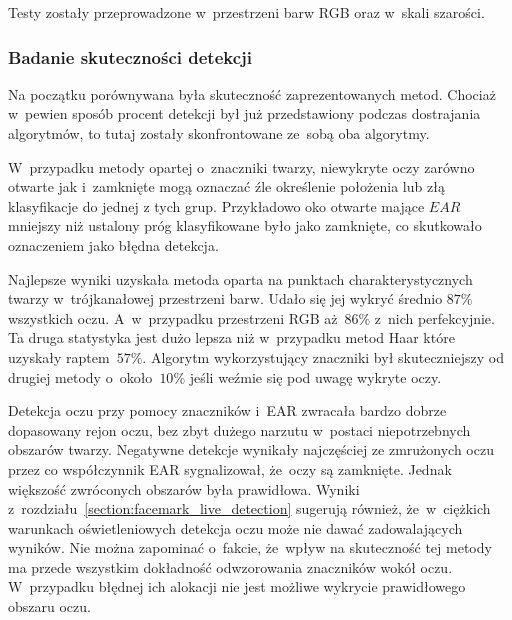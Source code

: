 \par

Testy zostały przeprowadzone w~przestrzeni barw RGB oraz w~skali szarości.

\subsubsection{Badanie skuteczności detekcji}

Na początku porównywana była skuteczność zaprezentowanych metod. Chociaż w~pewien sposób procent detekcji był już przedstawiony podczas dostrajania algorytmów, to tutaj zostały skonfrontowane ze~sobą oba algorytmy.

\par

W~przypadku metody opartej o~znaczniki twarzy, niewykryte oczy zarówno otwarte jak i~zamknięte mogą oznaczać źle określenie położenia lub złą klasyfikacje do jednej z tych grup. Przykładowo oko otwarte mające $EAR$ mniejszy niż ustalony próg klasyfikowane było jako zamknięte, co skutkowało oznaczeniem jako błędna detekcja. 



Najlepsze wyniki uzyskała metoda oparta na punktach charakterystycznych twarzy w~trójkanałowej przestrzeni barw. Udało się jej wykryć średnio $87\%$ wszystkich oczu. A~w~przypadku przestrzeni RGB aż~$86 \%$ z~nich perfekcyjnie. Ta druga statystyka jest dużo lepsza niż w~przypadku metod Haar które uzyskały raptem~$57\%$. Algorytm wykorzystujący znaczniki był skuteczniejszy od drugiej metody o~około~$10\%$ jeśli weźmie się pod uwagę wykryte oczy. 

\par

Detekcja oczu przy pomocy znaczników i~EAR zwracała bardzo dobrze dopasowany rejon oczu, bez zbyt dużego narzutu w~postaci niepotrzebnych obszarów twarzy. Negatywne detekcje wynikały najczęściej ze zmrużonych oczu przez co współczynnik EAR sygnalizował, że~oczy są zamknięte. Jednak większość zwróconych obszarów była prawidłowa. Wyniki z~rozdziału~\ref{section:facemark_live_detection} sugerują również, że~w~ciężkich warunkach oświetleniowych detekcja oczu może nie dawać zadowalających wyników. Nie można zapominać o~fakcie, że~wpływ na skuteczność tej metody ma przede wszystkim dokładność odwzorowania znaczników wokół oczu. W~przypadku błędnej ich alokacji nie jest możliwe wykrycie prawidłowego obszaru oczu. 

\par

